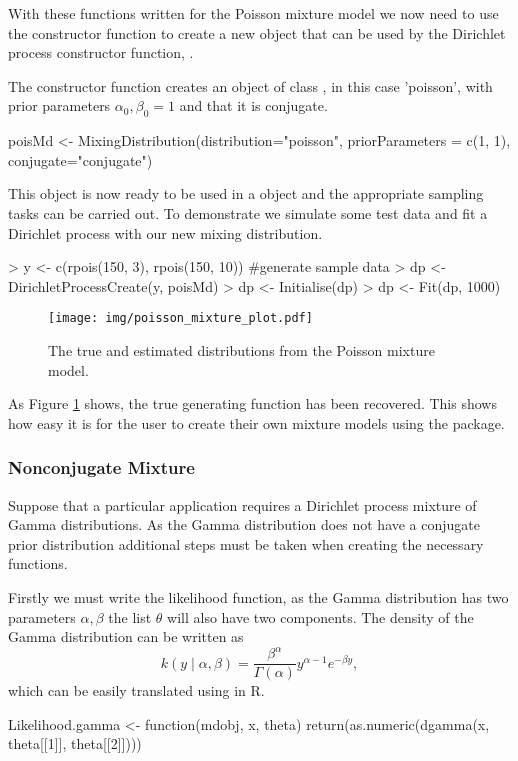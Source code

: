 \documentclass[nojss]{jss}
\begin{document}
With these functions written for the Poisson mixture model we now need to use the  constructor function to create a new object that can be used by the Dirichlet process constructor function, .

The constructor function  creates an object of class , in this case 'poisson', with prior parameters $\alpha_0, \beta_0 = 1$ and that it is conjugate.
\begin{CodeInput}
poisMd <- MixingDistribution(distribution="poisson",
  priorParameters = c(1, 1), conjugate="conjugate")
\end{CodeInput}
This object is now ready to be used in a  object and the appropriate sampling tasks can be carried out. To demonstrate we simulate some test data and fit a Dirichlet process with our new mixing distribution.

\begin{Schunk}
\begin{Sinput}
> y <- c(rpois(150, 3), rpois(150, 10)) #generate sample data
> dp <- DirichletProcessCreate(y, poisMd)
> dp <- Initialise(dp)
> dp <- Fit(dp, 1000)
\end{Sinput}
\end{Schunk}

\begin{figure}[tb]
\centering
	\texttt{[image: img/poisson\_mixture\_plot.pdf]}
\caption{The true and estimated distributions from the Poisson mixture model.}
\label{fig:poissonmixture}
\end{figure}
As Figure \ref{fig:poissonmixture} shows, the true generating function has been recovered. This shows how easy it is for the user to create their own mixture models using the  package.


\subsubsection{Nonconjugate Mixture}
Suppose that a particular application requires a Dirichlet process mixture of Gamma distributions. As the Gamma distribution does not have a conjugate prior distribution additional steps must be taken when creating the necessary functions.

Firstly we must write the likelihood function, as the Gamma distribution has two parameters $\alpha, \beta$ the list $\theta$ will also have two components. The density of the Gamma distribution can be written as
\begin{equation*}
k(y \mid \alpha, \beta) = \frac{\beta ^ \alpha}{\Gamma (\alpha)} y^{\alpha -1} e ^{- \beta y},
\end{equation*}
which can be easily translated using  in R.
\begin{CodeInput}
Likelihood.gamma <- function(mdobj, x, theta){
  return(as.numeric(dgamma(x, theta[[1]], theta[[2]])))
}
\end{CodeInput}
\end{document}

